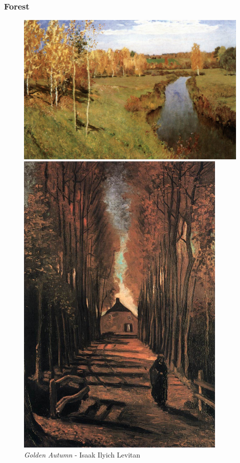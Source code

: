 \documentclass[a4paper]{article}
\begin{document}
\subsubsection{Forest}

\begin {figure}[h!]
\centering
\begin{minipage}[b]{.49\textwidth}
	\centering
	\includegraphics[width=\textwidth]{ForestPaintings/_Wth__Isaak_Ilyich_Levitan_-_Golden_Autumn.jpg}
    \caption{\emph{Golden Autumn} - Isaak Ilyich Levitan}
\end{minipage}
\hfill
\begin{minipage}[b]{.49\textwidth}
	\centering
	\includegraphics[width=0.9\textwidth]{ForestPaintings/_Stl___Wth__Vincent_van_Gogh_-_Avenua_of_Populars_in_Autumn.jpg}

\end{minipage}
\end{figure}
\end{document}
